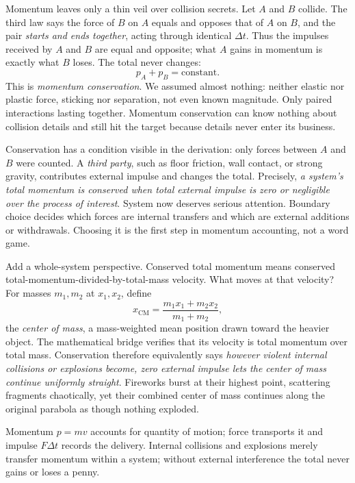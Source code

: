 Momentum leaves only a thin veil over collision secrets. Let \(A\) and \(B\) collide. The third law says the force of \(B\) on \(A\) equals and opposes that of \(A\) on \(B\), and the pair \emph{starts and ends together}, acting through identical \(\Delta t\). Thus the impulses received by \(A\) and \(B\) are equal and opposite; what \(A\) gains in momentum is exactly what \(B\) loses. The total never changes:
\[
p_{A}+p_{B}=\text{constant}.
\]
This is \emph{momentum conservation}. We assumed almost nothing: neither elastic nor plastic force, sticking nor separation, not even known magnitude. Only paired interactions lasting together. Momentum conservation can know nothing about collision details and still hit the target because details never enter its business.

Conservation has a condition visible in the derivation: only forces between \(A\) and \(B\) were counted. A \emph{third party}, such as floor friction, wall contact, or strong gravity, contributes external impulse and changes the total. Precisely, \emph{a system's total momentum is conserved when total external impulse is zero or negligible over the process of interest}. System now deserves serious attention. Boundary choice decides which forces are internal transfers and which are external additions or withdrawals. Choosing it is the first step in momentum accounting, not a word game.

Add a whole-system perspective. Conserved total momentum means conserved total-momentum-divided-by-total-mass velocity. What moves at that velocity? For masses \(m_1,m_2\) at \(x_1,x_2\), define
\[
x_{\text{CM}}=\frac{m_1x_1+m_2x_2}{m_1+m_2},
\]
the \emph{center of mass}, a mass-weighted mean position drawn toward the heavier object. The mathematical bridge verifies that its velocity is total momentum over total mass. Conservation therefore equivalently says \emph{however violent internal collisions or explosions become, zero external impulse lets the center of mass continue uniformly straight}. Fireworks burst at their highest point, scattering fragments chaotically, yet their combined center of mass continues along the original parabola as though nothing exploded.


\begin{oneline}
Momentum \(p=mv\) accounts for quantity of motion; force transports it and impulse \(F\Delta t\) records the delivery. Internal collisions and explosions merely transfer momentum within a system; without external interference the total never gains or loses a penny.
\end{oneline}

